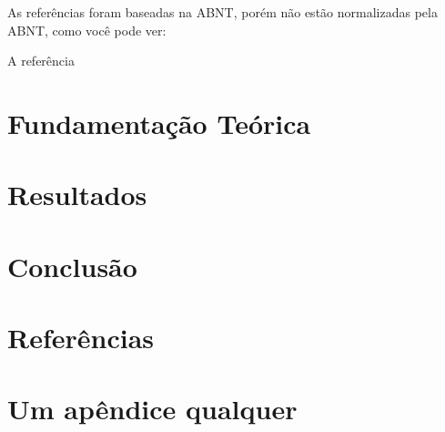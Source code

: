 \documentclass[12pt, a4paper, openright]{book}
\theoremstyle{definition}
\begin{document}
		As referências foram baseadas na ABNT, porém não estão normalizadas pela ABNT, como você pode ver:
		\begin{center}
			A referência \cite{Strogatz_l1}
		\end{center}
	
	\chapter{Fundamentação Teórica}
		
	\chapter{Resultados}
	
	\chapter{Conclusão}
	
	\chapter{Referências}
	
		\printbibliography[heading=none]
	
	\newpage
	\appendix
	
	\chapter{Um apêndice qualquer}\label{ap2}
	
%	
%	
	
	
\end{document}
